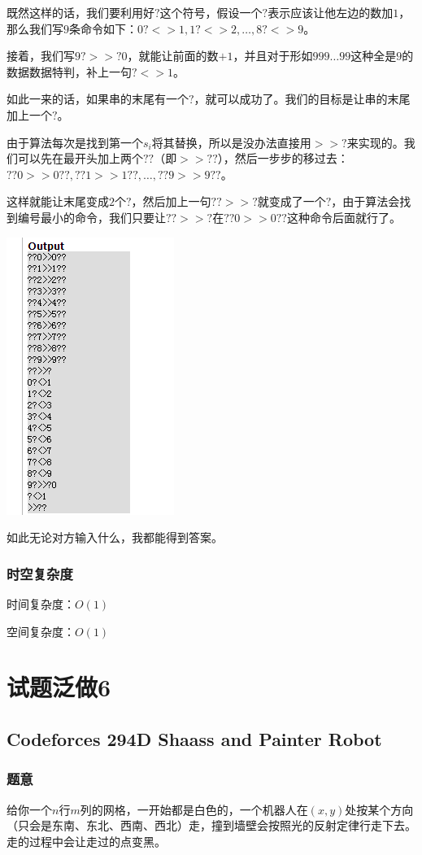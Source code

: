 \documentclass{ctexart}
\begin{document}
既然这样的话，我们要利用好$?$这个符号，假设一个$?$表示应该让他左边的数加$1$，那么我们写$9$条命令如下：$0?<>1,1?<>2,\ldots,8?<>9$。

接着，我们写$9?>>?0$，就能让前面的数$+1$，并且对于形如$999 \ldots 99$这种全是$9$的数据数据特判，补上一句$?<>1$。

如此一来的话，如果串的末尾有一个$?$，就可以成功了。我们的目标是让串的末尾加上一个$?$。

由于算法每次是找到第一个$s_i$将其替换，所以是没办法直接用$>>?$来实现的。我们可以先在最开头加上两个$??$（即$>>??$），然后一步步的移过去：$??0>>0??,??1>>1??,\ldots,??9>>9??$。

这样就能让末尾变成$2$个$?$，然后加上一句$??>>?$就变成了一个$?$，由于算法会找到编号最小的命令，我们只要让$??>>?$在$??0>>0??$这种命令后面就行了。

\includegraphics{algorithm.png}

如此无论对方输入什么，我都能得到答案。
\subsubsection{时空复杂度}
时间复杂度：$O(1)$

空间复杂度：$O(1)$
\newpage
\section{试题泛做6}
\subsection{Codeforces 294D Shaass and Painter Robot}
\subsubsection{题意}
给你一个$n$行$m$列的网格，一开始都是白色的，一个机器人在$(x,y)$处按某个方向（只会是东南、东北、西南、西北）走，撞到墙壁会按照光的反射定律行走下去。走的过程中会让走过的点变黑。
\end{document}
